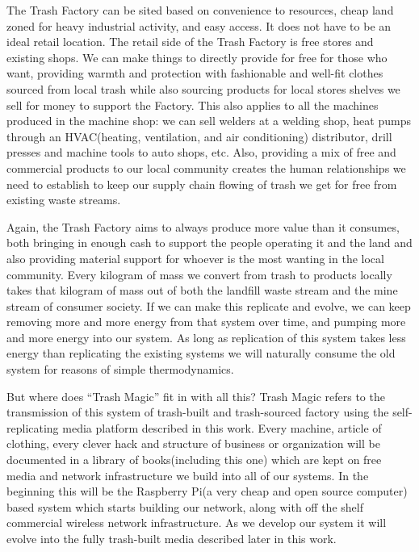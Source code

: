 The Trash Factory can be sited based on convenience to resources, cheap
land zoned for heavy industrial activity, and easy access. It does not
have to be an ideal retail location. The retail side of the Trash
Factory is free stores and existing shops. We can make things to
directly provide for free for those who want, providing warmth and
protection with fashionable and well-fit clothes sourced from local
trash while also sourcing products for local stores shelves we sell for
money to support the Factory. This also applies to all the machines
produced in the machine shop: we can sell welders at a welding shop,
heat pumps through an HVAC(heating, ventilation, and air conditioning)
distributor, drill presses and machine tools to auto shops, etc. Also,
providing a mix of free and commercial products to our local community
creates the human relationships we need to establish to keep our supply
chain flowing of trash we get for free from existing waste streams.

Again, the Trash Factory aims to always produce more value than it
consumes, both bringing in enough cash to support the people operating
it and the land and also providing material support for whoever is the
most wanting in the local community. Every kilogram of mass we convert
from trash to products locally takes that kilogram of mass out of both
the landfill waste stream and the mine stream of consumer society. If we
can make this replicate and evolve, we can keep removing more and more
energy from that system over time, and pumping more and more energy into
our system. As long as replication of this system takes less energy than
replicating the existing systems we will naturally consume the old
system for reasons of simple thermodynamics.

But where does ``Trash Magic'' fit in with all this? Trash Magic refers
to the transmission of this system of trash-built and trash-sourced
factory using the self-replicating media platform described in this
work. Every machine, article of clothing, every clever hack and
structure of business or organization will be documented in a library of
books(including this one) which are kept on free media and network
infrastructure we build into all of our systems. In the beginning this
will be the Raspberry Pi(a very cheap and open source computer) based
system which starts building our network, along with off the shelf
commercial wireless network infrastructure. As we develop our system it
will evolve into the fully trash-built media described later in this
work.

